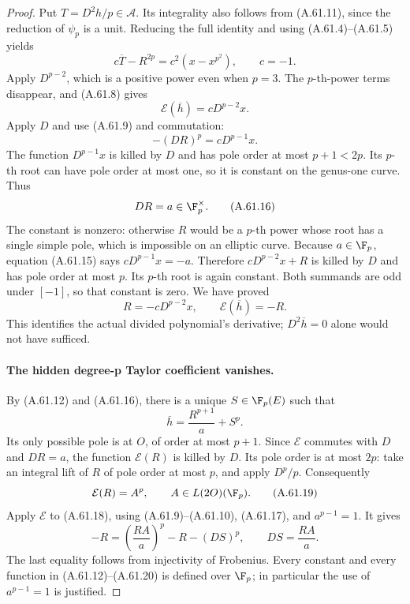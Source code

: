 \begin{proof}
Put \(T=D^2h/p\in\mathcal A\). Its integrality
also follows from (A.61.11), since the reduction of
\(\psi_p\) is a unit. Reducing the full identity and
using (A.61.4)--(A.61.5) yields
\[
 c\overline T-R^{2p}=c^2(x-x^{p^2}),
                         \qquad c=-1.                 \tag{A.61.13}
\]
Apply \(D^{p-2}\), which is a positive power even
when \(p=3\). The \(p\)-th-power terms disappear,
and (A.61.8) gives
\[
                   \mathcal E(\overline h)
                           =cD^{p-2}x.                \tag{A.61.14}
\]
Apply \(D\) and use (A.61.9) and commutation:
\[
                      -(DR)^p=cD^{p-1}x.               \tag{A.61.15}
\]
The function \(D^{p-1}x\) is killed by \(D\) and
has pole order at most \(p+1<2p\). Its \(p\)-th
root can have pole order at most one, so it is
constant on the genus-one curve. Thus
\[
                         DR=a\in\F_p^\times.          \tag{A.61.16}
\]
The constant is nonzero: otherwise \(R\) would be
a \(p\)-th power whose root has a single simple
pole, which is impossible on an elliptic curve.
Because \(a\in\F_p\), equation (A.61.15) says
\(cD^{p-1}x=-a\). Therefore
\(cD^{p-2}x+R\) is killed by \(D\) and has pole
order at most \(p\). Its \(p\)-th root is again
constant. Both summands are odd under \([-1]\),
so that constant is zero. We have proved
\[
               R=-cD^{p-2}x,
                \qquad \mathcal E(\overline h)=-R.    \tag{A.61.17}
\]
This identifies the actual divided polynomial's
derivative; \(D^2\overline h=0\) alone would not
have sufficed.

\paragraph{The hidden degree-p Taylor coefficient vanishes.}
By (A.61.12) and (A.61.16), there is a unique
\(S\in\F_p(E)\) such that
\[
            \overline h=\frac{R^{p+1}}a+S^p.           \tag{A.61.18}
\]
Its only possible pole is at \(O\), of order at
most \(p+1\). Since \(\mathcal E\) commutes with
\(D\) and \(DR=a\), the function
\(\mathcal E(R)\) is killed by \(D\). Its pole
order is at most \(2p\): take an integral lift of
\(R\) of pole order at most \(p\), and apply
\(D^p/p\). Consequently
\[
           \mathcal E(R)=A^p,
                      \qquad A\in L(2O)(\F_p).        \tag{A.61.19}
\]
Apply \(\mathcal E\) to (A.61.18), using
(A.61.9)--(A.61.10), (A.61.17), and
\(a^{p-1}=1\). It gives
\[
 -R=\left(\frac{RA}{a}\right)^p-R-(DS)^p,
                  \qquad DS=\frac{RA}{a}.             \tag{A.61.20}
\]
The last equality follows from injectivity of
Frobenius. Every constant and every function in
(A.61.12)--(A.61.20) is defined over \(\F_p\);
in particular the use of \(a^{p-1}=1\) is justified.


\end{proof}
